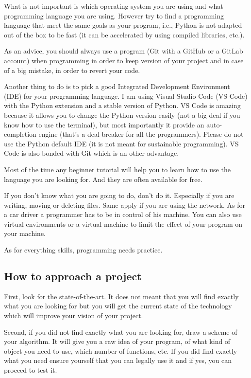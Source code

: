 \documentclass[english, 12 pt, openany, oneside]{book}
\begin{document}
What is not important is which operating system you are using and what programming language you are using. However try to find a programming language that meet the same goals as your program, i.e., Python is not adapted out of the box to be fast (it can be accelerated by using compiled libraries, etc.).

As an advice, you should always use a  program (Git with a GitHub or a GitLab account) when programming in order to keep version of your project and in case of a big mistake, in order to revert your code.

Another thing to do is to pick a good Integrated Development Environment (IDE) for your programming language. I am using Visual Studio Code (VS Code) with the Python extension and a stable version of Python. VS Code is amazing because it allows you to change the Python version easily (not a big deal if you know how to use the terminal), but most importantly it provide an auto-completion engine (that's a deal breaker for all the programmers). Please do not use the Python default IDE (it is not meant for sustainable programming). VS Code is also bonded with Git which is an other advantage.

Most of the time any beginner tutorial will help you to learn how to use the language you are looking for. And they are often available for free.

If you don't know what you are going to do, don't do it. Especially if you are writing, moving or deleting files. Same apply if you are using the network. As for a car driver a programmer has to be in control of his machine. You can also use virtual environments or a virtual machine to limit the effect of your program on your machine.

As for everything skills, programming needs practice.

\subsection{How to approach a project}
First, look for the state-of-the-art. It does not meant that you will find exactly what you are looking for but you will get the current state of the technology which will improve your vision of your project.

Second, if you did not find exactly what you are looking for, draw a scheme of your algorithm. It will give you a raw idea of your program, of what kind of object you need to use, which number of functions, etc. If you did find exactly what you need ensure yourself that you can legally use it and if yes, you can proceed to test it.
\end{document}
